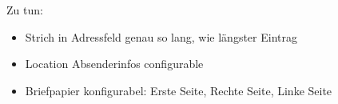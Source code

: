 \documentclass[twoside, A]{brbrief}
\begin{document}
	
	\maketitle{}
	
	\lipsum[1-10]
	
	Zu tun:
	\begin{itemize}
		\item Strich in Adressfeld genau so lang, wie längster Eintrag
		\item Location Absenderinfos configurable
		\item Briefpapier konfigurabel: Erste Seite, Rechte Seite, Linke Seite
	\end{itemize}
	
	
	
\end{document}
